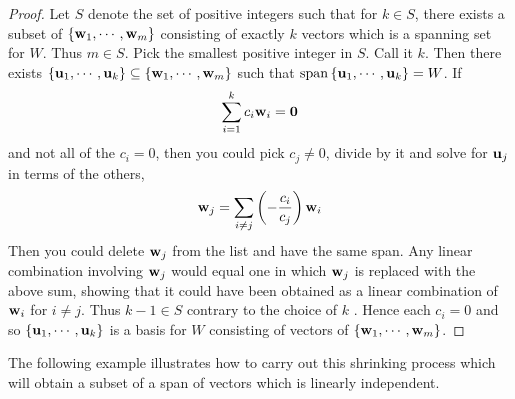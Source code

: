 \begin{proof}
  Let $S$ denote the set of positive integers such that for $ k\in S$,
  there exists a subset of $\left\{\mbox{\bf w}_{1},\cdots ,\mbox{\bf w}_{m}\right\} $
  consisting of exactly $k$ vectors which is a spanning set for
  $W$. Thus $m\in S$. Pick the smallest positive integer in $S$. Call
  it $k$. Then there exists
  $\left\{\mbox{\bf u}_{1},\cdots , \mbox{\bf u}_{k}\right\} \subseteq
  \left\{\mbox{\bf w}_{1},\cdots ,\mbox{\bf w} _{m}\right\} $ such that
  $\sspan\set{\vect{u}_{1},\cdots ,\vect{u} _{k}} =W$. If
  \begin{equation*}
    \sum_{i=1}^{k}c_{i}\mbox{\bf w}_{i}=\mbox{\bf 0}
  \end{equation*}
  and not all of the $c_{i}=0$, then you could pick $c_{j}\neq 0$,
  divide by it and solve for $\mbox{\bf u}_{j}$ in terms of the others,
  \begin{equation*}
    \mbox{\bf w}_{j}=\sum_{i\neq j}\left(-\frac{c_{i}}{c_{j}}\right) \mbox{\bf w}_{i}
  \end{equation*}
  Then you could delete $\mbox{\bf w}_{j}$ from the list and have the same
  span. Any linear combination involving $\mbox{\bf w}_{j}$ would equal
  one in which $\mbox{\bf w}_{j}$ is replaced with the above sum, showing
  that it could have been obtained as a linear combination of
  $\mbox{\bf w}_{i}$ for $i\neq j$. Thus $k-1\in S$ contrary to the choice
  of $k$ . Hence each $c_{i}=0$ and so
  $\left\{\mbox{\bf u}_{1},\cdots ,\mbox{\bf u} _{k}\right\} $ is a basis for $W$
  consisting of vectors of $\left\{\mbox{\bf w} _{1},\cdots ,\mbox{\bf w}_{m}\right\}$.
\end{proof}

The following example illustrates how to carry out this shrinking
process which will obtain a subset of a span of vectors which is
linearly independent.

